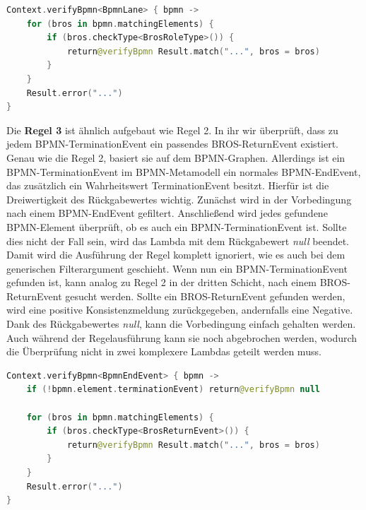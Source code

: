 \begin{lstlisting}[language=Kotlin, caption=Implementierung von Regel 2, label=lst:implementation_rule_2]
Context.verifyBpmn<BpmnLane> { bpmn ->
    for (bros in bpmn.matchingElements) {
        if (bros.checkType<BrosRoleType>()) {
            return@verifyBpmn Result.match("...", bros = bros)
        }
    }
    Result.error("...")
}
\end{lstlisting}

Die \textbf{Regel 3} ist ähnlich aufgebaut wie Regel 2.
In ihr wir überprüft, dass zu jedem BPMN-TerminationEvent ein passendes BROS-ReturnEvent existiert.
Genau wie die Regel 2, basiert sie auf dem BPMN-Graphen.
Allerdings ist ein BPMN-TerminationEvent im BPMN-Metamodell ein normales BPMN-EndEvent, das zusätzlich ein Wahrheitswert TerminationEvent besitzt.
Hierfür ist die Dreiwertigkeit des Rückgabewertes wichtig.
Zunächst wird in der Vorbedingung nach einem BPMN-EndEvent gefiltert.
Anschließend wird jedes gefundene BPMN-Element überprüft, ob es auch ein BPMN-TerminationEvent ist.
Sollte dies nicht der Fall sein, wird das Lambda mit dem Rückgabewert \emph{null} beendet.
Damit wird die Ausführung der Regel komplett ignoriert, wie es auch bei dem generischen Filterargument geschieht.
Wenn nun ein BPMN-TerminationEvent gefunden ist, kann analog zu Regel 2 in der dritten Schicht, nach einem BROS-ReturnEvent gesucht werden.
Sollte ein BROS-ReturnEvent gefunden werden, wird eine positive Konsistenzmeldung zurückgegeben, andernfalls eine Negative.
Dank des Rückgabewertes \emph{null}, kann die Vorbedingung einfach gehalten werden.
Auch während der Regelausführung kann sie noch abgebrochen werden, wodurch die Überprüfung nicht in zwei komplexere Lambdas geteilt werden muss.

\begin{lstlisting}[language=Kotlin, caption=Implementierung von Regel 3, label=lst:implementation_rule_3]
Context.verifyBpmn<BpmnEndEvent> { bpmn ->
    if (!bpmn.element.terminationEvent) return@verifyBpmn null

    for (bros in bpmn.matchingElements) {
        if (bros.checkType<BrosReturnEvent>()) {
            return@verifyBpmn Result.match("...", bros = bros)
        }
    }
    Result.error("...")
}
\end{lstlisting}

